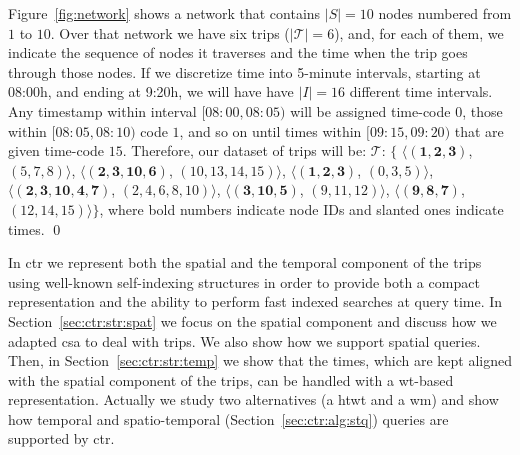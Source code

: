 	\begin{example} \label{exp:ctr}
	Figure~\ref{fig:network} shows a network that contains $|S|=10$ nodes 
	numbered from $1$ to $10$. Over that network we have six trips ($|\mathcal{T}|=6$),
	and, for each of them, we indicate the sequence of nodes it traverses
	and the time when the trip goes through those nodes. If we discretize time into
	5-minute intervals, starting at 08:00h, and ending at 9:20h, we will have
	have $|I|=16$ different time intervals. Any timestamp within
	interval $\mathit{[08\!:\!00,08\!:\!05)}$ will
	be assigned time-code $0$, those within $\mathit{[08\!:\!05,08\!:\!10)}$ code $1$, and so on until
	times within $\mathit{[09\!:\!15,09\!:\!20)}$ that are given time-code $15$.  
	Therefore, our dataset of trips will be: 
	$\mathcal{T}$: $\{$%
	$\langle (\mathbf{1,2,3     })$, $(\mathit{5,7,8})                     \rangle$, 
	$\langle (\mathbf{2,3,10,6  })$, $(\mathit{10,13,14,15})           \rangle$, 
	$\langle (\mathbf{1,2,3     })$, $(\mathit{0,3,5})                     \rangle$, 
	$\langle (\mathbf{2,3,10,4,7})$, $(\mathit{2,4,6,8,10}) \rangle$, 
	$\langle (\mathbf{3,10,5    })$, $(\mathit{9,11,12})                     \rangle$, 
	$\langle (\mathbf{9,8,7     })$, $(\mathit{12,14,15})                    \rangle$$\}$, 
	where bold numbers indicate node IDs and slanted ones indicate times. \qed
	\end{example}

    \medskip
	In \gls{ctr} we represent both the spatial and the temporal component of the trips using well-known
	self-indexing structures in order to provide both a compact representation and the ability to 
	perform fast indexed searches at query time. In Section~\ref{sec:ctr:str:spat} we focus on the
	spatial component and discuss how we adapted  \gls{csa} to deal with trips. We also
	show how we support spatial queries. Then, in Section~\ref{sec:ctr:str:temp} we show that the times,
	which are kept aligned with the spatial component of the trips, can be handled with   
	a \gls{wt}-based representation. Actually we study two alternatives (a \gls{htwt} and a \gls{wm}) 
	and show how temporal and spatio-temporal (Section~\ref{sec:ctr:alg:stq}) queries are supported by \gls{ctr}.


